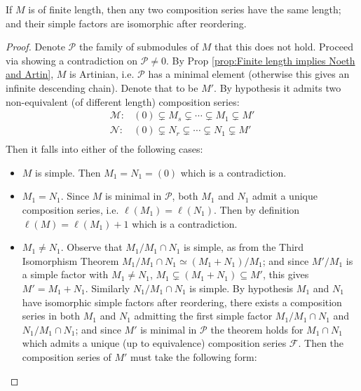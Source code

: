 \documentclass{article}
\begin{document}
\begin{theorem}\label{thm:Jordan-Holder}
   If $M$ is of finite length, then any two composition series have the same length; and their simple factors are isomorphic after reordering. 
\end{theorem}

\begin{proof}
    Denote $\mathcal{P}$ the family of submodules of $M$ that this does not hold. Proceed via showing a contradiction on $\mathcal{P} \neq 0$. By Prop \ref{prop:Finite length implies Noeth and Artin}, $M$ is Artinian, i.e. $\mathcal{P}$ has a minimal element (otherwise this gives an infinite descending chain). Denote that to be $M'$. By hypothesis it admits two non-equivalent (of different length) composition series:
    \[
    \begin{array}{cc}
        \mathcal{M}: & (0) \subsetneq M_s \subsetneq \cdots \subsetneq M_1 \subsetneq M' \\
        \mathcal{N}: & (0) \subsetneq N_r \subsetneq \cdots \subsetneq N_1 \subsetneq M' \\
    \end{array}
    \]
    Then it falls into either of the following cases:
    \begin{itemize}
        \item $M$ is simple. Then $M_1 = N_1 = (0)$ which is a contradiction.
        \item $M_1 = N_1$. Since $M$ is minimal in $\mathcal{P}$, both $M_1$ and $N_1$ admit a unique composition series, i.e. $\ell(M_1) = \ell(N_1)$. Then by definition $\ell(M) = \ell(M_1) + 1$ which is a contradiction.
        \item $M_1\neq N_1$. Observe that $M_1/M_1\cap N_1$ is simple, as from the Third Isomorphism Theorem $M_1/M_1\cap N_1 \simeq (M_1 + N_1)/M_1$; and since $M'/M_1$ is a simple factor with $M_1 \neq N_1$, $M_1 \subsetneq (M_1 + N_1) \subseteq M'$, this gives $M' = M_1 + N_1$. Similarly $N_1/M_1\cap N_1$ is simple. By hypothesis $M_1$ and $N_1$ have isomorphic simple factors after reordering, there exists a composition series in both $M_1$ and $N_1$ admitting the first simple factor $M_1/M_1\cap N_1$ and $N_1/M_1\cap N_1$; and since $M'$ is minimal in $\mathcal{P}$ the theorem holds for $M_1\cap N_1$ which admits a unique (up to equivalence) composition series $\mathcal{F}$. Then the composition series of $M'$ must take the following form:
        \begin{figure}[htbp]
            \centering
        \end{figure}


\end{itemize}
\end{proof}
\end{document}
